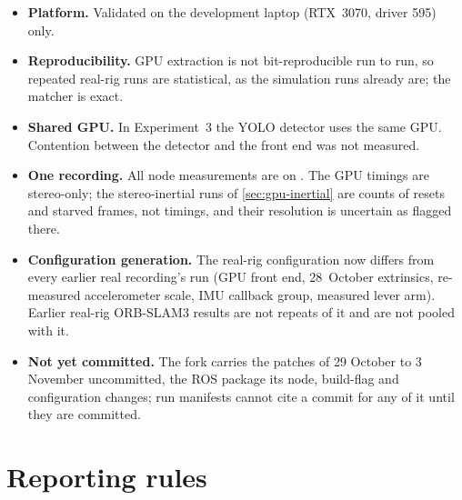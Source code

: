 \documentclass[11pt,a4paper,notitlepage]{report}
\begin{document}
\begin{itemize}
\item \textbf{Platform.} Validated on the development laptop (RTX~3070,
  driver 595) only. 
\item \textbf{Reproducibility.} GPU extraction is not bit-reproducible run to
  run, so repeated real-rig runs are statistical, as the simulation runs
  already are; the matcher is exact.
\item \textbf{Shared GPU.} In Experiment~3 the YOLO detector uses the same GPU.
  Contention between the detector and the front end was not measured.
\item \textbf{One recording.} All node measurements are on
  . The GPU timings are stereo-only; the stereo-inertial
  runs of \cref{sec:gpu-inertial} are counts of resets and starved frames, not
  timings, and their resolution is uncertain as flagged there.
\item \textbf{Configuration generation.} The real-rig configuration now
  differs from every earlier real recording's run (GPU front end, 28~October
  extrinsics, re-measured accelerometer scale, IMU callback group, measured
  lever arm). Earlier real-rig ORB-SLAM3 results are not repeats of it and are
  not pooled with it.
\item \textbf{Not yet committed.} The fork carries the patches of 29 October to
  3 November uncommitted, the ROS package its node, build-flag and configuration
  changes; run manifests cannot cite a commit for any of it until they are
  committed.
\end{itemize}

\section{Reporting rules}
\label{sec:gpu-rules}
\end{document}
